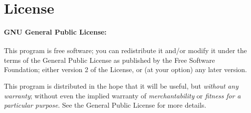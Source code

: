 
\section{License}
\paragraph{GNU General Public License:} This program is free software; you can redistribute it and/or modify it under the terms of the  General Public License as published by the Free Software Foundation; either version 2 of the License, or (at your option) any later version.

This program is distributed in the hope that it will be useful, but \emph{without any warranty}; without even the implied warranty of \emph{merchantability} or \emph{fitness for a particular purpose}. See the  General Public License for more details.